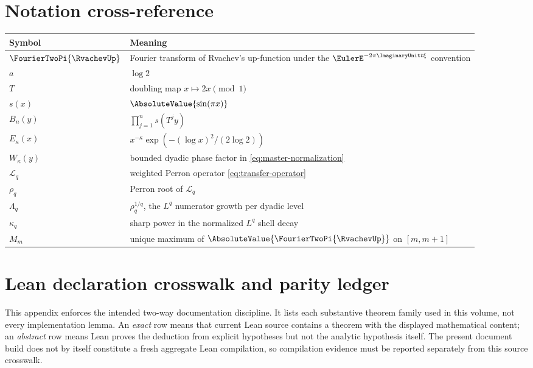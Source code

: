 \documentclass[11pt,oneside]{article}
\numberwithin{equation}{section}
\theoremstyle{definition}
\theoremstyle{remark}
\begin{document}
\section{Notation cross-reference}
\label{app:notation}

\begin{center}
\begin{tabularx}{\textwidth}{@{}lX@{}}
\toprule
Symbol & Meaning\\
\midrule
$\FourierTwoPi{\RvachevUp}$ & Fourier transform of Rvachev's up-function under the
$\EulerE^{-2\pi\ImaginaryUnit t\xi}$ convention\\
$a$ & $\log2$\\
$T$ & doubling map $x\mapsto2x\pmod1$\\
$s(x)$ & $\AbsoluteValue{\sin(\pi x)}$\\
$B_n(y)$ & $\prod_{j=1}^n s(T^jy)$\\
$E_\kappa(x)$ & $x^{-\kappa}\exp(- (\log x)^2/(2\log2))$\\
$W_\kappa(y)$ & bounded dyadic phase factor in \eqref{eq:master-normalization}\\
$\mathcal L_q$ & weighted Perron operator \eqref{eq:transfer-operator}\\
$\rho_q$ & Perron root of $\mathcal L_q$\\
$\Lambda_q$ & $\rho_q^{1/q}$, the $L^q$ numerator growth per dyadic level\\
$\kappa_q$ & sharp power in the normalized $L^q$ shell decay\\
$M_m$ & unique maximum of $\AbsoluteValue{\FourierTwoPi{\RvachevUp}}$ on $[m,m+1]$\\
\bottomrule
\end{tabularx}
\end{center}

\section{Lean declaration crosswalk and parity ledger}
\label{app:lean-crosswalk}

This appendix enforces the intended two-way documentation discipline.  It lists each
substantive theorem family used in this volume, not every implementation lemma.  An
\emph{exact} row means that current Lean source contains a theorem with the displayed
mathematical content; an \emph{abstract} row means Lean proves the deduction from explicit
hypotheses but not the analytic hypothesis itself.  The present document build does not by
itself constitute a fresh aggregate Lean compilation, so compilation evidence must be
reported separately from this source crosswalk.
\end{document}
